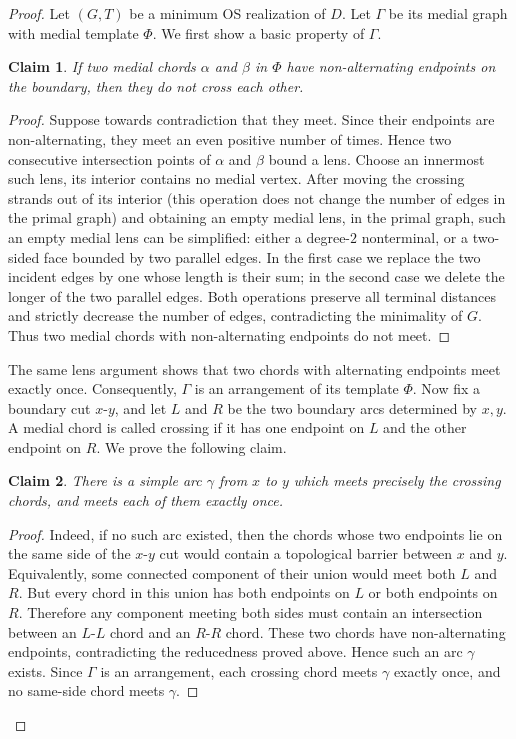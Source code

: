 \documentclass[10pt,a4paper]{amsart}
\newtheorem{claim}{Claim}
\begin{document}
\begin{proof}

Let $(G,T)$ be a minimum OS realization of $D$. Let $\Gamma$ be its
medial graph with medial template $\Phi$.  We first show a basic property of $\Gamma$.
\begin{claim}
If two medial chords
$\alpha$ and $\beta$ in $\Phi$ have non-alternating endpoints on the boundary, then they do not cross each other.    
\end{claim}
\begin{proof}
Suppose towards contradiction that they meet. Since their endpoints are non-alternating, they
meet an even positive number of times.  Hence two consecutive
intersection points of $\alpha$ and $\beta$ bound a lens.  Choose an
innermost such lens, its interior contains no medial vertex. After moving the crossing strands out of its interior (this operation does not change the number of edges in the primal graph) and obtaining an empty medial lens, in the
primal graph, such an empty medial lens can be simplified: either a degree-$2$ nonterminal, or a two-sided
face bounded by two parallel edges.  In the first case we replace the
two incident edges by one whose length is their sum; in the second
case we delete the longer of the two parallel edges.  Both operations
preserve all terminal distances and strictly decrease the number of
edges, contradicting the minimality of $G$.  Thus two medial chords
with non-alternating endpoints do not meet. 
\end{proof}  

The same lens argument
shows that two chords with alternating endpoints meet exactly once.
Consequently, $\Gamma$ is an arrangement of its template $\Phi$.
%
Now fix a boundary cut $x$-$y$, and let $L$ and $R$ be the two boundary
arcs determined by $x,y$.  A medial chord is called crossing if
it has one endpoint on $L$ and the other endpoint on $R$.  We prove the following claim. 
\begin{claim}
There is a simple arc $\gamma$ from $x$ to $y$ which meets precisely the
crossing chords, and meets each of them exactly once.    
\end{claim}
\begin{proof}
Indeed, if no such arc existed, then the chords whose two endpoints
lie on the same side of the $x$-$y$ cut would contain a topological
barrier between $x$ and $y$.  Equivalently, some connected component of
their union would meet both $L$ and $R$.  But every chord in this union
has both endpoints on $L$ or both endpoints on $R$.  Therefore any
component meeting both sides must contain an intersection between an
$L$-$L$ chord and an $R$-$R$ chord.  These two chords have
non-alternating endpoints, contradicting the reducedness proved above.
Hence such an arc $\gamma$ exists.  Since $\Gamma$ is an arrangement,
each crossing chord meets $\gamma$ exactly once, and no same-side
chord meets $\gamma$.
\end{proof}


\end{proof}
\end{document}
